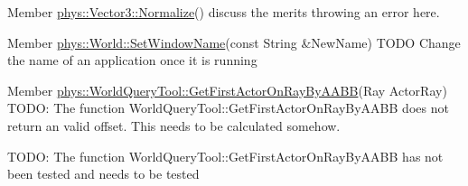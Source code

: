 \label{dd/da0/todo__todo000029}
\hypertarget{dd/da0/todo__todo000029}{}
 
\begin{DoxyDescription}
\item[Member \hyperlink{classphys_1_1Vector3_ae39fe0545df88148bcd668b3bd2a4388}{phys::Vector3::Normalize}() ]discuss the merits throwing an error here. 
\end{DoxyDescription}

\label{dd/da0/todo__todo000034}
\hypertarget{dd/da0/todo__todo000034}{}
 
\begin{DoxyDescription}
\item[Member \hyperlink{classphys_1_1World_acd0dff342c08fe3008226488b7c53d97}{phys::World::SetWindowName}(const String \&NewName) ]TODO Change the name of an application once it is running 
\end{DoxyDescription}

\label{dd/da0/todo__todo000035}
\hypertarget{dd/da0/todo__todo000035}{}
 
\begin{DoxyDescription}
\item[Member \hyperlink{classphys_1_1WorldQueryTool_a67575416c2e9c652bbd873649ee38baf}{phys::WorldQueryTool::GetFirstActorOnRayByAABB}(Ray ActorRay) ]TODO: The function WorldQueryTool::GetFirstActorOnRayByAABB does not return an valid offset. This needs to be calculated somehow. 

TODO: The function WorldQueryTool::GetFirstActorOnRayByAABB has not been tested and needs to be tested 
\end{DoxyDescription}